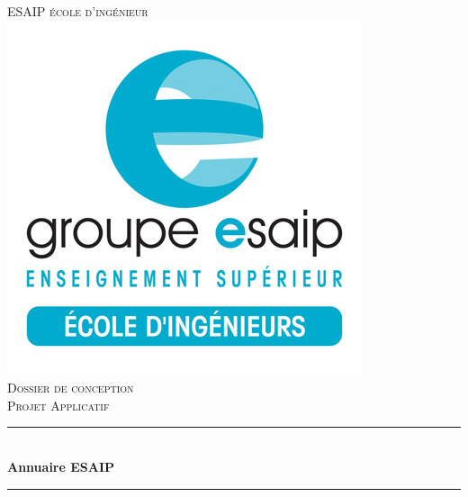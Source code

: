 \documentclass[11pt,a4paper]{report}
\begin{document}
\begin{titlepage}

\newcommand{\HRule}{\rule{\linewidth}{0.5mm}} %

\center %
 

\textsc{\LARGE ESAIP école d'ingénieur}\\[1.5cm] %
\includegraphics[scale=0.5]{logo_esaip}\\[1cm] %
\textsc{\Large Dossier de conception}\\[0.5cm] %
\textsc{\large Projet Applicatif}\\[0.5cm] %


\HRule \\[0.4cm]
{ \huge \bfseries Annuaire ESAIP}\\[0.4cm] %
\HRule \\[1.5cm]
 

\end{titlepage}
\end{document}
